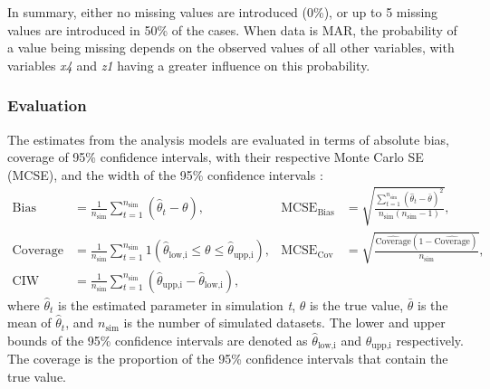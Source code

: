 \documentclass[3p,12pt,a4paper]{elsarticle}
\begin{document}
In summary, either no missing values are introduced (0\%), or up to 5 missing values are introduced in 50\% of the cases. When data is MAR, the probability of a value being missing depends on the observed values of all other variables, with variables \textit{x4} and \textit{z1} having a greater influence on this probability.

\subsubsection{Evaluation}
The estimates from the analysis models are evaluated in terms of absolute bias, coverage of 95\% confidence intervals, with their respective Monte Carlo SE (MCSE), and the width of the 95\% confidence intervals \citep{morris2019,oberman2023}:
\begin{align}
    \text{Bias} &= \frac{1}{n_{\text{sim}}} \sum_{t=1}^{n_{\text{sim}}} (\hat{\theta}_t - \theta), &
    \text{MCSE}_{\text{Bias}} &= \sqrt{\frac{\sum_{t=1}^{n_{\text{sim}}} (\hat{\theta}_t - \bar{\theta})^2}{n_{\text{sim}}(n_{\text{sim}}-1)}}, \label{eq:bias} \\
    \text{Coverage} &= \frac{1}{n_{\text{sim}}} \sum_{t=1}^{n_{\text{sim}}} 1(\hat{\theta}_{\text{low,i}} \leq \theta \leq \hat{\theta}_{\text{upp,i}}), &
    \text{MCSE}_{\text{Cov}} &= \sqrt{\frac{\hat{\text{Coverage}}(1-\hat{\text{Coverage}})}{n_{\text{sim}}}}, \label{eq:coverage} \\
    \text{CIW} &= \frac{1}{n_{\text{sim}}} \sum_{t=1}^{n_{\text{sim}}} (\hat{\theta}_{\text{upp,i}} - \hat{\theta}_{\text{low,i}}), \label{eq:width}
\end{align} where $\hat{\theta}_t$ is the estimated parameter in simulation \textit{t}, $\theta$ is the true value, $\bar{\theta}$ is the mean of $\hat{\theta}_t$, and $n_{\text{sim}}$ is the number of simulated datasets. The lower and upper bounds of the 95\% confidence intervals are denoted as $\hat{\theta}_{\text{low,i}}$ and $\hat{\theta}_{\text{upp,i}}$ respectively. The coverage is the proportion of the 95\% confidence intervals that contain the true value. 
\end{document}
